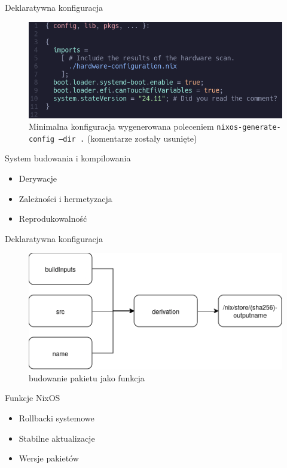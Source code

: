 \documentclass{beamer}
\begin{document}
\begin{frame}{Deklaratywna konfiguracja}
    \begin{figure}
        \includegraphics[width=\linewidth]{./assets/configuration.png}
        \caption*{\scriptsize Minimalna konfiguracja wygenerowana poleceniem \texttt{nixos-generate-config --dir .} (komentarze zostały usunięte)}
    \end{figure}
\end{frame}

\begin{frame}{System budowania i kompilowania}
    \begin{itemize}
        \item Derywacje
        \item Zależności i hermetyzacja
        \item Reprodukowalność
    \end{itemize}
\end{frame}

\begin{frame}{Deklaratywna konfiguracja}
    \begin{figure}
        \includegraphics[width=\linewidth]{./assets/derivation.png}
        \caption*{\scriptsize budowanie pakietu jako funkcja}
    \end{figure}
\end{frame}

\begin{frame}{Funkcje NixOS}
    \begin{itemize}
        \item Rollbacki systemowe
        \item Stabilne aktualizacje
        \item Wersje pakietów
    \end{itemize}
\end{frame}
\end{document}

